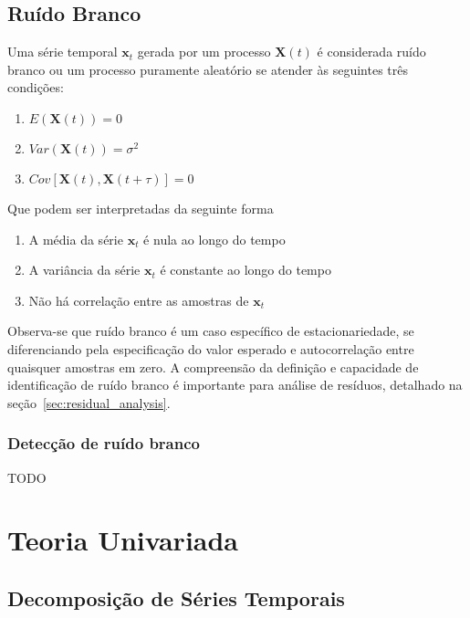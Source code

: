 \section{Ruído Branco}\label{sec:white_noise}

Uma série temporal $\mathbf{x}_t$ gerada por um processo $\mathbf{X}(t)$ é
considerada ruído branco ou um processo puramente aleatório se atender às
seguintes três condições:

\begin{enumerate}
    \item $E(\mathbf{X}(t)) = 0$
    \item $Var(\mathbf{X}(t)) = \sigma^2$
    \item $Cov[\mathbf{X}(t), \mathbf{X}(t+\tau)] = 0$
\end{enumerate}\vspace{.5cm}

Que podem ser interpretadas da seguinte forma

\begin{enumerate}
    \item A média da série $\mathbf{x}_t$ é nula ao longo do tempo
    \item A variância da série $\mathbf{x}_t$ é constante ao longo do tempo
    \item Não há correlação entre as amostras de $\mathbf{x}_t$
\end{enumerate}\vspace{.5cm}

Observa-se que ruído branco é um caso específico de estacionariedade, se
diferenciando pela especificação do valor esperado e autocorrelação entre
quaisquer amostras em zero. A compreensão da definição e capacidade de
identificação de ruído branco é importante para análise de resíduos, detalhado
na seção~\ref{sec:residual_analysis}.

\subsection{Detecção de ruído branco}

TODO

\chapter{Teoria Univariada} %
\label{chap:univariate_models}

\section{Decomposição de Séries Temporais}
\label{sec:decomposition}

